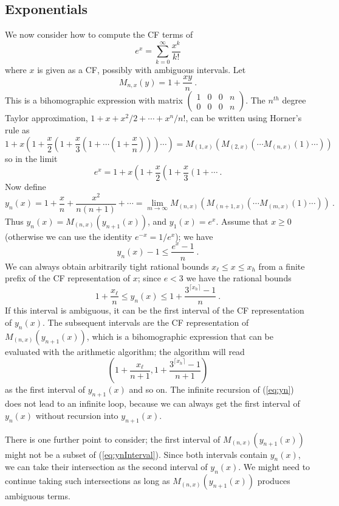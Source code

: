 \documentclass[11pt, oneside]{amsart}   	%
\newcommand{\bihomographic}[8]{\left(\begin{smallmatrix}#1&#2&#3&#4\\#5&#6&#7&#8\end{smallmatrix}\right)}
\renewcommand{\:}{\negthickspace:\negthickspace}
\begin{document}
\subsection{Exponentials} We now consider how to compute the CF terms of 
\[
e^x = \sum_{k=0}^{\infty} \frac{x^k}{k!}
\]
where $x$ is given as a CF, possibly with ambiguous intervals. Let
\[
M_{n,x}(y) = 1 + \frac{xy}{n} \ .
\]
This is a bihomographic expression with matrix $\bihomographic{1}{0}{0}{n}{0}{0}{0}{n}$. The $n^{th}$ degree Taylor approximation,
$1 + x + x^2/2 +\cdots + x^n/{n!}$, can be written using Horner's rule as
\[
 1 + x \left(1 + \frac{x}{2}\left( 1 + \frac{x}{3}\left(1 + \cdots \left(1 + \frac{x}{n}\right)\right)\right) \cdots \right) = M_{(1,x)}( M_{(2,x)}( \cdots M_{(n,x)}(1) \cdots ) )
 \]
 so in the limit
 \begin{equation}\label{eq:spigot}
 e^x = 1 + x \left(1 + \frac{x}{2}\left( 1 + \frac{x}{3}\left(1 + \cdots \right. \right.  \right.   \ .
 \end{equation} 
 Now define
 \begin{equation}\label{eq:yn}
 y_n(x) = 1 + \frac{x}{n} + \frac{x^2}{n(n+1)} + \cdots = \lim_{m\to\infty} M_{(n,x)}( M_{(n+1,x)}( \cdots M_{(m,x)}(1) \cdots ) ) \ .
  \end{equation}
Thus $y_n(x) = M_{(n,x)}(y_{n+1}(x))$, and $y_1(x) = e^x$.
Assume that $x \geq 0$ (otherwise we can use the identity $e^{-x} = 1/e^x$); we have
 \[
 y_n(x) - 1 \leq \frac{e^x - 1}{n} \ .
 \]
  We can always obtain arbitrarily tight rational bounds $x_{\ell} \leq x \leq x_{h}$ from a finite prefix of the CF representation of $x$; since $e < 3$  we have the rational bounds
 \begin{equation}\label{eq:ynInterval}
  1+\frac{x_{\ell}}{n} \leq y_n(x) \leq  1 + \frac{3^{\lceil x_{h}\rceil}-1}{n} \ .
 \end{equation}
 If this interval is ambiguous, it can be the first interval of the CF representation of $y_n(x)$.
The subsequent intervals are the CF representation of $M_{(n,x)}(y_{n+1}(x))$,
which is a bihomographic expression that can be evaluated with the arithmetic algorithm;
the algorithm will read
\[
\left(1+\frac{x_{\ell}}{n+1} , 1 + \frac{3^{\lceil x_{h}\rceil}-1}{n+1}\right)
\]
as the first interval of $y_{n+1}(x)$ and so on. The infinite recursion of (\ref{eq:yn}) does not lead to an infinite loop, because we can always get the first interval of $y_n(x)$ without recursion into $y_{n+1}(x)$.

There is one further point to consider; the first interval of $M_{(n,x)}(y_{n+1}(x))$ might not be a subset of (\ref{eq:ynInterval}). Since both intervals contain $y_n(x)$, we can take their intersection as the second interval of $y_n(x)$. We might need to continue taking such intersections as long as $M_{(n,x)}(y_{n+1}(x))$ produces ambiguous terms. 
\end{document}
